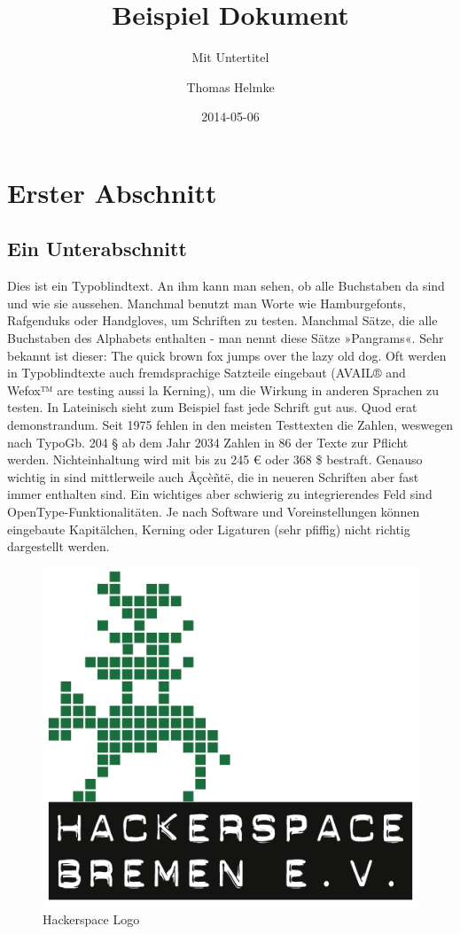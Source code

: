 \documentclass[titlepage]{scrartcl}
\title{Beispiel Dokument}
\subtitle{Mit Untertitel}
\author{Thomas Helmke}
\date{2014-05-06}
\begin{document}
\maketitle

\tableofcontents
\listoffigures
\listoftables
\clearpage

\section{Erster Abschnitt}\label{sec:Kapitel1}
\subsection{Ein Unterabschnitt}
Dies ist ein Typoblindtext. An ihm kann man sehen, ob alle Buchstaben da sind und wie sie aussehen. Manchmal benutzt man Worte wie Hamburgefonts, Rafgenduks oder Handgloves, um Schriften zu testen. Manchmal Sätze, die alle Buchstaben des Alphabets enthalten - man nennt diese Sätze »Pangrams«. Sehr bekannt ist dieser: The quick brown fox jumps over the lazy old dog. Oft werden in Typoblindtexte auch fremdsprachige Satzteile eingebaut (AVAIL® and Wefox™ are testing aussi la Kerning), um die Wirkung in anderen Sprachen zu testen. In Lateinisch sieht zum Beispiel fast jede Schrift gut aus. Quod erat demonstrandum. Seit 1975 fehlen in den meisten Testtexten die Zahlen, weswegen nach TypoGb. 204 § ab dem Jahr 2034 Zahlen in 86 der Texte zur Pflicht werden. Nichteinhaltung wird mit bis zu 245 \euro{} oder 368 \$ bestraft. Genauso wichtig in sind mittlerweile auch Âçcèñtë, die in neueren Schriften aber fast immer enthalten sind. Ein wichtiges aber schwierig zu integrierendes Feld sind OpenType-Funktionalitäten. Je nach Software und Voreinstellungen können eingebaute Kapitälchen, Kerning oder Ligaturen (sehr pfiffig) nicht richtig dargestellt werden.
\begin{figure}[H]
\centering
\includegraphics[width=1.1\textwidth]{HSpaceHBLogo}
\caption{Hackerspace Logo}
\label{fig:HSHBLogo}
\end{figure}
\end{document}
